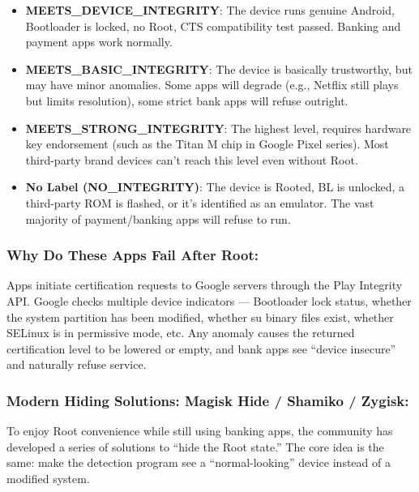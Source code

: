 \begin{itemize}
  \item \textbf{MEETS\_DEVICE\_INTEGRITY}: The device runs genuine Android, Bootloader is locked, no Root, CTS compatibility test passed. Banking and payment apps work normally.
  \item \textbf{MEETS\_BASIC\_INTEGRITY}: The device is basically trustworthy, but may have minor anomalies. Some apps will degrade (e.g., Netflix still plays but limits resolution), some strict bank apps will refuse outright.
  \item \textbf{MEETS\_STRONG\_INTEGRITY}: The highest level, requires hardware key endorsement (such as the Titan M chip in Google Pixel series). Most third-party brand devices can't reach this level even without Root.
  \item \textbf{No Label (NO\_INTEGRITY)}: The device is Rooted, BL is unlocked, a third-party ROM is flashed, or it's identified as an emulator. The vast majority of payment/banking apps will refuse to run.
\end{itemize}

\subsubsection*{Why Do These Apps Fail After Root:}

Apps initiate certification requests to Google servers through the Play Integrity API. Google checks multiple device indicators — Bootloader lock status, whether the system partition has been modified, whether su binary files exist, whether SELinux is in permissive mode, etc. Any anomaly causes the returned certification level to be lowered or empty, and bank apps see “device insecure” and naturally refuse service.

\subsubsection*{Modern Hiding Solutions: Magisk Hide / Shamiko / Zygisk:}

To enjoy Root convenience while still using banking apps, the community has developed a series of solutions to “hide the Root state.” The core idea is the same: make the detection program see a “normal-looking” device instead of a modified system.

